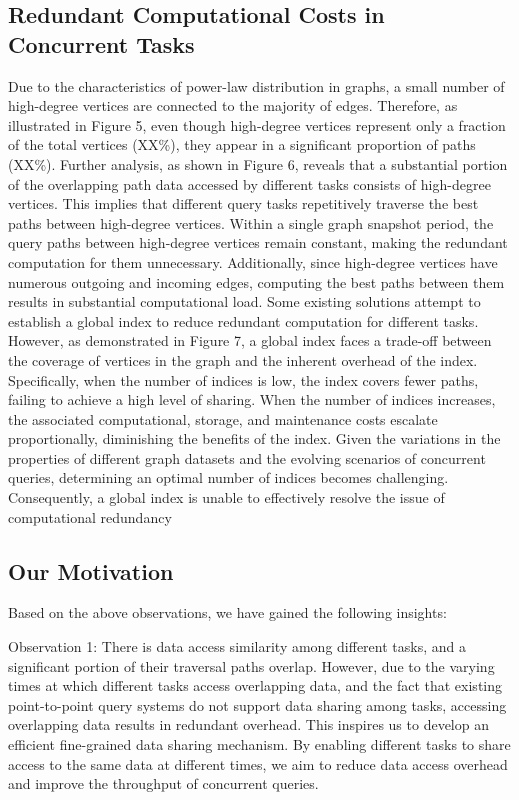 \documentclass[lettersize,journal]{IEEEtran} %
\begin{document}
\subsection{Redundant Computational Costs in Concurrent Tasks}
Due to the characteristics of power-law distribution in graphs, a small number of high-degree vertices are connected to the majority of edges. Therefore, as illustrated in Figure 5, even though high-degree vertices represent only a fraction of the total vertices (XX\%), they appear in a significant proportion of paths (XX\%). Further analysis, as shown in Figure 6, reveals that a substantial portion of the overlapping path data accessed by different tasks consists of high-degree vertices. This implies that different query tasks repetitively traverse the best paths between high-degree vertices. Within a single graph snapshot period, the query paths between high-degree vertices remain constant, making the redundant computation for them unnecessary. Additionally, since high-degree vertices have numerous outgoing and incoming edges, computing the best paths between them results in substantial computational load. Some existing solutions attempt to establish a global index to reduce redundant computation for different tasks. However, as demonstrated in Figure 7, a global index faces a trade-off between the coverage of vertices in the graph and the inherent overhead of the index. Specifically, when the number of indices is low, the index covers fewer paths, failing to achieve a high level of sharing. When the number of indices increases, the associated computational, storage, and maintenance costs escalate proportionally, diminishing the benefits of the index. Given the variations in the properties of different graph datasets and the evolving scenarios of concurrent queries, determining an optimal number of indices becomes challenging. Consequently, a global index is unable to effectively resolve the issue of computational redundancy

\subsection{Our Motivation}
Based on the above observations, we have gained the following insights:

Observation 1: There is data access similarity among different tasks, and a significant portion of their traversal paths overlap. However, due to the varying times at which different tasks access overlapping data, and the fact that existing point-to-point query systems do not support data sharing among tasks, accessing overlapping data results in redundant overhead. This inspires us to develop an efficient fine-grained data sharing mechanism. By enabling different tasks to share access to the same data at different times, we aim to reduce data access overhead and improve the throughput of concurrent queries.
\end{document}
